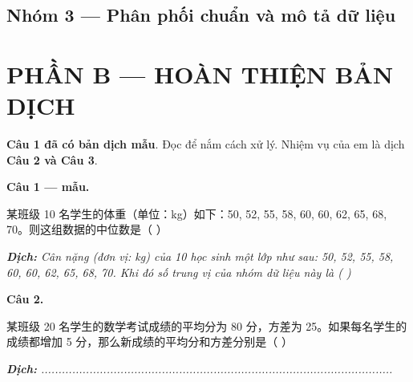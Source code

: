 \documentclass[11pt, a4paper]{article}
\begin{document}
\subsection{Nhóm 3 — Phân phối chuẩn và mô tả dữ liệu}


\section{PHẦN B — HOÀN THIỆN BẢN DỊCH}

\textbf{Câu 1 đã có bản dịch mẫu}. Đọc để nắm cách xử lý. Nhiệm vụ của em là dịch \textbf{Câu 2 và Câu 3}.

\textbf{Câu 1 — mẫu.}

某班级 10 名学生的体重（单位：kg）如下：50, 52, 55, 58, 60, 60, 62, 65, 68, 70。则这组数据的中位数是（ ）

\noindent\emph{\textbf{Dịch:} Cân nặng (đơn vị: kg) của 10 học sinh một lớp như sau: 50, 52, 55, 58, 60, 60, 62, 65, 68, 70. Khi đó số trung vị của nhóm dữ liệu này là ( )}

\textbf{Câu 2.}

某班级 20 名学生的数学考试成绩的平均分为 80 分，方差为 25。如果每名学生的成绩都增加 5 分，那么新成绩的平均分和方差分别是（ ）

\noindent\emph{\textbf{Dịch:} ......................................................................................................}
\end{document}
